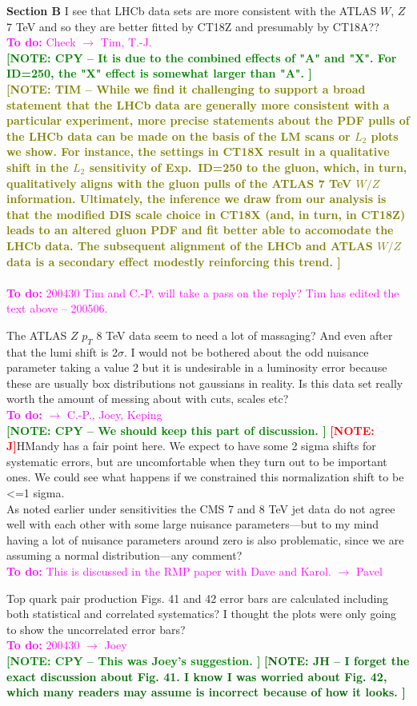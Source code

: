 \documentclass[aps,prd,amsmath,nofootinbib,floatfix,fleqn]{revtex4}
\newcommand{\TODO}[1]{\textcolor{magenta}{
\quad\vspace{3pt} \\ {\bf To do:} #1 \\
}}
\newcommand{\NOTE}[1]{\textcolor{red}{ \bf[NOTE: #1]}}
\newcommand{\NOTECPY}[1]{\textcolor{green}{ \bf[NOTE: CPY -- #1 ]}}
\newcommand{\NOTEJH}[1]{\textcolor{darkgreen}{ \bf[NOTE: JH -- #1 ]}}
\newcommand{\NOTETIM}[1]{\textcolor{olive}{ \bf[NOTE: TIM -- #1 ]}}
\begin{document}
\noindent
{\bf Section B}
I see that LHCb data sets are more consistent with the ATLAS $W$, $Z$ 7 TeV and so they are better fitted by CT18Z and presumably by CT18A??
%
\TODO{Check $\to$ Tim, T.-J.}
\NOTECPY{It is due to the combined effects of "A" and "X". For ID=250, the "X" effect is somewhat larger than "A".}\\
%
\NOTETIM{While we find it challenging to support a broad statement that the LHCb data are generally more consistent with a particular experiment, more precise statements about the PDF pulls of the LHCb data can be made on the basis of the LM scans
or $L_2$ plots we show.  For instance, the settings in CT18X result in a qualitative shift in the $L_2$ sensitivity of Exp.~ID=250 to
the gluon, which, in turn, qualitatively aligns with the gluon pulls of the ATLAS 7 TeV $W/Z$ information.  Ultimately, the inference we draw from our analysis is that the modified
DIS scale choice in CT18X (and, in turn, in CT18Z) leads to an altered gluon PDF and fit better
able to accomodate the LHCb data. The subsequent alignment of the LHCb and ATLAS $W/Z$ data
is a secondary effect modestly reinforcing this trend.}\\
\TODO{200430 Tim and C.-P. will take a pass on the reply? Tim has edited the text above -- 200506.}

\noindent
The ATLAS $Z$ $p_T$ 8 TeV data seem to need a lot of massaging? And even after that the lumi shift is 2$\sigma$. I would not be bothered about the odd nuisance parameter taking a value 2 but it is undesirable in a luminosity error because these are usually box distributions not gaussians in reality. Is this data set really worth the amount of messing about with cuts, scales etc?  
\TODO{$\to$ C.-P., Joey, Keping}
\NOTECPY{We should keep this part of discussion.}
\NOTE JH{Mandy has a fair point here. We expect to have some 2 sigma shifts for systematic errors, but are uncomfortable when they turn out to be important ones. We could see what happens if we constrained this normalization shift to be <=1 sigma. }\\

\noindent
As noted earlier under sensitivities the CMS 7 and 8 TeV jet data do not agree well with each other with some large nuisance parameters—but to my mind having a lot of nuisance parameters around zero is also problematic, since we are assuming a normal distribution—any comment?  
\TODO{This is discussed in the RMP paper with Dave and Karol. $\to$ Pavel}


\noindent
Top quark pair production Figs. 41 and 42 error bars are calculated including both statistical and correlated systematics? I thought the plots were only going to show the uncorrelated error bars?  
\TODO{200430 $\to$  Joey}
\NOTECPY{This was Joey's suggestion.}
\NOTEJH{I forget the exact discussion about Fig. 41. I know I was worried about Fig. 42, which many readers may assume is incorrect because of how it looks. }\\
\end{document}
